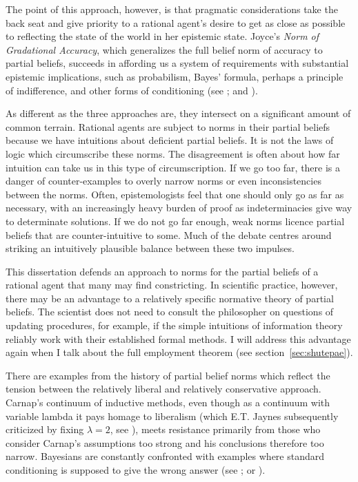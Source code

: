 \documentclass[phd,12pt,oneside]{ubcthesis}
\begin{document}
The point of this approach, however, is that pragmatic considerations
take the back seat and give priority to a rational agent's desire to
get as close as possible to reflecting the state of the world in her
epistemic state. Joyce's \emph{Norm of Gradational Accuracy}, which
generalizes the full belief norm of accuracy to partial beliefs,
succeeds in affording us a system of requirements with substantial
epistemic implications, such as probabilism, Bayes' formula, perhaps a
principle of indifference, and other forms of conditioning (see
; and ).

As different as the three approaches are, they intersect on a
significant amount of common terrain. Rational agents are subject to
norms in their partial beliefs because we have intuitions about
deficient partial beliefs. It is not the laws of logic which
circumscribe these norms. The disagreement is often about how far
intuition can take us in this type of circumscription. If we go too
far, there is a danger of counter-examples to overly narrow norms or
even inconsistencies between the norms. Often, epistemologists feel
that one should only go as far as necessary, with an increasingly
heavy burden of proof as indeterminacies give way to determinate
solutions. If we do not go far enough, weak norms licence partial
beliefs that are counter-intuitive to some. Much of the debate centres
around striking an intuitively plausible balance between these two
impulses.

This dissertation defends an approach to norms for the partial beliefs
of a rational agent that many may find constricting. In scientific
practice, however, there may be an advantage to a relatively specific
normative theory of partial beliefs. The scientist does not need to
consult the philosopher on questions of updating procedures, for
example, if the simple intuitions of information theory reliably work
with their established formal methods. I will address this advantage
again when I talk about the full employment theorem (see
section~\ref{sec:shutepae}).

There are examples from the history of partial belief norms which
reflect the tension between the relatively liberal and relatively
conservative approach. Carnap's continuum of inductive methods, even
though as a continuum with variable lambda it pays homage to
liberalism (which E.T. Jaynes subsequently criticized by fixing
$\lambda=2$, see ), meets resistance
primarily from those who consider Carnap's assumptions too strong and
his conclusions therefore too narrow. Bayesians are constantly
confronted with examples where standard conditioning is supposed to
give the wrong answer (see ; or
).
\end{document}
